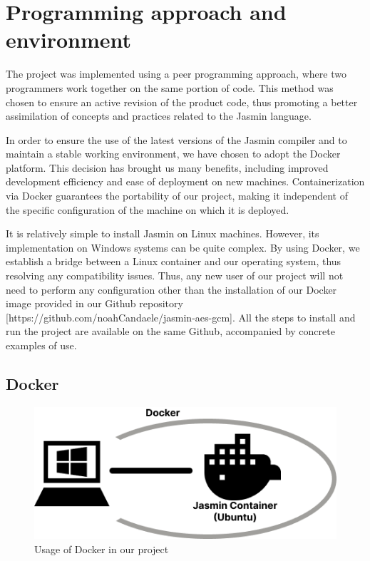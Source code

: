 \documentclass[runningheads]{llncs}
\begin{document}
\section{Programming approach and environment}

The project was implemented using a peer programming approach, where two programmers work together on the same portion of code. This method was chosen to ensure an active revision of the product code, thus promoting a better assimilation of concepts and practices related to the Jasmin language.

In order to ensure the use of the latest versions of the Jasmin compiler and to maintain a stable working environment, we have chosen to adopt the Docker platform. This decision has brought us many benefits, including improved development efficiency and ease of deployment on new machines. Containerization via Docker guarantees the portability of our project, making it independent of the specific configuration of the machine on which it is deployed.

It is relatively simple to install Jasmin on Linux machines. However, its implementation on Windows systems can be quite complex. By using Docker, we establish a bridge between a Linux container and our operating system, thus resolving any compatibility issues. Thus, any new user of our project will not need to perform any configuration other than the installation of our Docker image provided in our Github repository [https://github.com/noahCandaele/jasmin-aes-gcm]. All the steps to install and run the project are available on the same Github, accompanied by concrete examples of use.

\subsection{Docker}

\begin{figure}[ht] %
    \centering
    \includegraphics[scale=0.50]{resources/docker.png}
    \caption{Usage of Docker in our project}
\end{figure}
\end{document}
